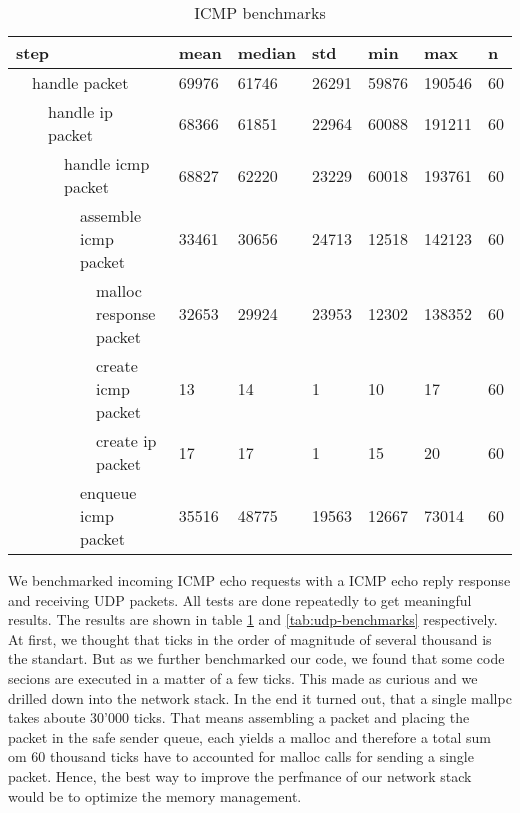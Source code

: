 \begin{table}[]
    \begin{tabular}{|llllll|l|l|l|l|l|l|}
    \hline
    \multicolumn{6}{|l|}{step} & mean & median & std & min & max & n \\ \hline
    \multicolumn{1}{|l|}{} & \multicolumn{5}{l|}{handle packet} & 69976 & 61746 & 26291 & 59876 & 190546 & 60 \\
    \multicolumn{1}{|l|}{} & \multicolumn{1}{l|}{} & \multicolumn{4}{l|}{handle ip packet} & 68366 & 61851 & 22964 & 60088 & 191211 & 60 \\
    \multicolumn{1}{|l|}{} & \multicolumn{1}{l|}{} & \multicolumn{1}{l|}{} & \multicolumn{3}{l|}{handle icmp packet} & 68827 & 62220 & 23229 & 60018 & 193761 & 60 \\
    \multicolumn{1}{|l|}{} & \multicolumn{1}{l|}{} & \multicolumn{1}{l|}{} & \multicolumn{1}{l|}{} & \multicolumn{2}{l|}{assemble icmp packet} & 33461 & 30656 & 24713 & 12518 & 142123 & 60 \\
    \multicolumn{1}{|l|}{} & \multicolumn{1}{l|}{} & \multicolumn{1}{l|}{} & \multicolumn{1}{l|}{} & \multicolumn{1}{l|}{} & malloc response packet & 32653 & 29924 & 23953 & 12302 & 138352 & 60 \\
    \multicolumn{1}{|l|}{} & \multicolumn{1}{l|}{} & \multicolumn{1}{l|}{} & \multicolumn{1}{l|}{} & \multicolumn{1}{l|}{} & create icmp packet & 13 & 14 & 1 & 10 & 17 & 60 \\
    \multicolumn{1}{|l|}{} & \multicolumn{1}{l|}{} & \multicolumn{1}{l|}{} & \multicolumn{1}{l|}{} & \multicolumn{1}{l|}{} & create ip packet & 17 & 17 & 1 & 15 & 20 & 60 \\
    \multicolumn{1}{|l|}{} & \multicolumn{1}{l|}{} & \multicolumn{1}{l|}{} & \multicolumn{1}{l|}{} & \multicolumn{2}{l|}{enqueue icmp packet} & 35516 & 48775 & 19563 & 12667 & 73014 & 60 \\
    \hline
    \end{tabular}
    \caption{ICMP benchmarks}
    \label{tab:icmp-benchmarks}
\end{table}

We benchmarked incoming ICMP echo requests with a ICMP echo reply response and  receiving UDP packets. All tests are done repeatedly to get meaningful results. 
The results are shown in table \ref{tab:icmp-benchmarks} and \ref{tab:udp-benchmarks} respectively. At first, we thought that ticks in the order of magnitude of several thousand is the standart. But as we further benchmarked our code, we found that some code secions are executed in a matter of a few ticks. This made as curious and we drilled down into the network stack. In the end it turned out, that a single mallpc takes aboute 30'000 ticks. That means assembling a packet and placing the packet in the safe sender queue, each yields a malloc and therefore a total sum om 60 thousand ticks have to accounted for malloc calls for sending a single packet.
Hence, the best way to improve the perfmance of our network stack would be to optimize the memory management.

